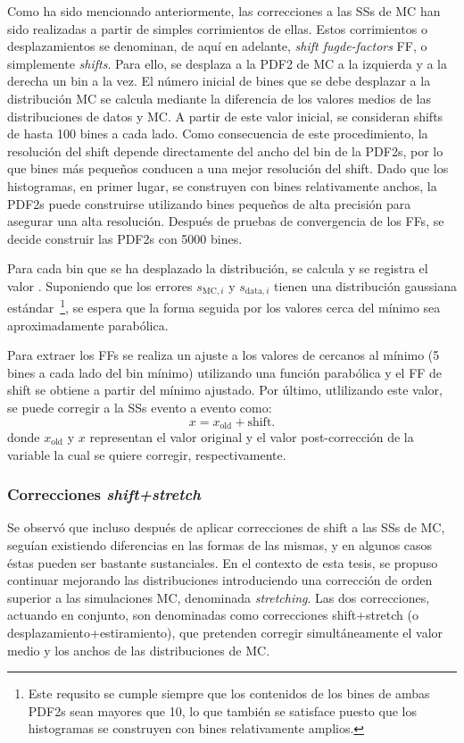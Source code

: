 Como ha sido mencionado anteriormente, las correcciones a las \acp{SS} de \ac{MC} han sido realizadas a partir de simples corrimientos de ellas. Estos corrimientos o desplazamientos se denominan, de aqu\'i en adelante, \textit{shift fugde-factors} \ac{FF}, o simplemente \textit{shifts}.
Para ello, se desplaza a la \ac{PDF2} de \ac{MC} a la izquierda y a la derecha un bin a la vez.
El número inicial de bines que se debe desplazar a la distribución \ac{MC} se calcula mediante la diferencia de los valores medios de las distribuciones de datos y \ac{MC}. A partir de este valor inicial, se consideran shifts de hasta 100 bines a cada lado.
Como consecuencia de este procedimiento, la resolución del shift depende directamente del ancho del bin de la \acp{PDF2}, por lo que bines m\'as pequeños conducen a una mejor resolución del shift. Dado que los histogramas, en primer lugar, se construyen con bines relativamente anchos, la \acp{PDF2} puede construirse utilizando bines pequeños de alta precisión para asegurar una alta resolución. Después de pruebas de convergencia de los \acp{FF}, se decide construir las \acp{PDF2} con 5000 bines.

Para cada bin que se ha desplazado la distribución, se calcula y se registra el valor \chisq. Suponiendo que los errores \(s_{\text{MC},i}\) y \(s_{\text{data},i}\) tienen una distribución gaussiana est\'andar~\footnote{Este requsito se cumple siempre que los contenidos de los bines de ambas \acp{PDF2} sean mayores que 10, lo que también se satisface puesto que los histogramas se construyen con bines relativamente amplios.}, se espera que la forma seguida por los valores \chisq cerca del m\'inimo sea aproximadamente parab\'olica.

Para extraer los \acp{FF} se realiza un ajuste a los valores de \chisq cercanos al mínimo (5 bines a cada lado del bin mínimo) utilizando una función parabólica y el \ac{FF} de shift se obtiene a partir del mínimo ajustado. Por último, utlilizando este valor, se puede corregir a la \acp{SS} evento a evento como:
\[
	x = x_{\text{old}} + \text{shift}.
\]
donde \(x_{\text{old}}\) y \(x\) representan el valor original y el valor post-correcci\'on de la variable la cual se quiere corregir, respectivamente.


\subsubsection{Correcciones \textit{shift+stretch}}

Se observó que incluso después de aplicar correcciones de shift a las \acp{SS} de \ac{MC}, seguían existiendo diferencias en las formas de las mismas, y en algunos casos éstas pueden ser bastante sustanciales. 
En el contexto de esta tesis, se propuso continuar mejorando las distribuciones introduciendo una correcci\'on de orden superior a las simulaciones \ac{MC}, denominada \textit{stretching}. Las dos correcciones, actuando en conjunto, son denominadas como correcciones shift+stretch (o desplazamiento+estiramiento), que pretenden corregir simultáneamente el valor medio y los anchos de las distribuciones de \ac{MC}.

